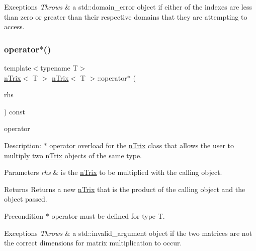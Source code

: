 \begin{DoxyExceptions}{Exceptions}
{\em Throws} & a std\+::domain\+\_\+error object if either of the indexes are less than zero or greater than their respective domains that they are attempting to access. \\
\hline
\end{DoxyExceptions}
\mbox{\label{classnTrix_ad04ab9579b2941f7be4b0402085fd40f}} 
\subsubsection{\texorpdfstring{operator$\ast$()}{operator*()}\hspace{0.1cm}{\footnotesize\ttfamily [1/2]}}
{\footnotesize\ttfamily template$<$typename T$>$ \\
\hyperlink{classnTrix}{n\+Trix}$<$ T $>$ \hyperlink{classnTrix}{n\+Trix}$<$ T $>$\+::operator$\ast$ (\begin{DoxyParamCaption}\item[{const \hyperlink{classnTrix}{n\+Trix}$<$ T $>$ \&}]{rhs }\end{DoxyParamCaption}) const}




\begin{DoxyItemize}
\item operator 
\end{DoxyItemize}

Description\+: $\ast$ operator overload for the \hyperlink{classnTrix}{n\+Trix} class that allows the user to multiply two \hyperlink{classnTrix}{n\+Trix} objects of the same type. 
\begin{DoxyParams}{Parameters}
{\em rhs} & is the \hyperlink{classnTrix}{n\+Trix} to be multiplied with the calling object. \\
\hline
\end{DoxyParams}
\begin{DoxyReturn}{Returns}
Returns a new \hyperlink{classnTrix}{n\+Trix} that is the product of the calling object and the object passed. 
\end{DoxyReturn}
\begin{DoxyPrecond}{Precondition}
$\ast$ operator must be defined for type T. 
\end{DoxyPrecond}

\begin{DoxyExceptions}{Exceptions}
{\em Throws} & a std\+::invalid\+\_\+argument object if the two matrices are not the correct dimensions for matrix multiplication to occur. \\
\hline
\end{DoxyExceptions}
\mbox{\label{classnTrix_a6e3a9b2026a59a6822b060abf6d97425}} 
